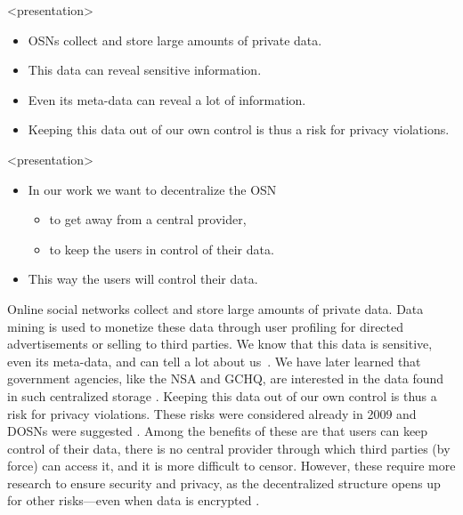 \begin{frame}<presentation>
  \begin{itemize}

    \item \acp{OSN} collect and store large amounts of private data.

    \item This data can reveal sensitive information.

    \item Even its meta-data can reveal a lot of information.

    \item Keeping this data out of our own control is thus a risk for privacy 
      violations.

  \end{itemize}
\end{frame}

\begin{frame}<presentation>
  \begin{itemize}

    \item In our work we want to decentralize the \ac{OSN}
      \begin{itemize}
        \item to get away from a central provider,
        \item to keep the users in control of their data.
      \end{itemize}

    \item This way the users will control their data.


  \end{itemize}
\end{frame}

Online social networks collect and store large amounts of private data.
Data mining is used to monetize these data through user profiling for directed 
advertisements or selling to third parties.
We know that this data is sensitive, even its meta-data, and can tell a lot 
about us~\cite[e.g.][]{pregnancy}.
We have later learned that government agencies, like the \ac{NSA} and 
\ac{GCHQ}, are interested in the data found in such centralized storage 
\cite{prism}.
Keeping this data out of our own control is thus a risk for privacy violations.
These risks were considered already in 2009 and \acp{DOSN} were suggested 
\cite[e.g.][]{peerson}.
Among the benefits of these are that users can keep control of their data, 
there is no central provider through which third parties (by force) can access 
it, and it is more difficult to censor.
However, these require more research to ensure security and privacy, as the 
decentralized structure opens up for other risks---even when data is encrypted 
\cite{metadata}.

